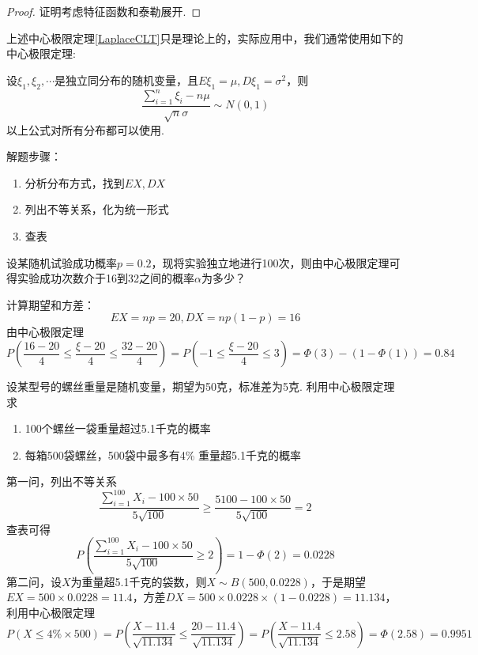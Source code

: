 \begin{proof}
    证明考虑特征函数和泰勒展开.
\end{proof}
上述中心极限定理\ref{LaplaceCLT}只是理论上的，实际应用中，我们通常使用如下的中心极限定理:
\begin{theorem}[中心极限定理]
    设$\xi_1,\xi_2,\cdots$是独立同分布的随机变量，且$E\xi_1=\mu,D\xi_1=\sigma^2$，则
    \[
        \frac{\sum_{i=1}^n \xi_i-n\mu}{\sqrt{n}\sigma}\sim N(0,1)
    \]
    以上公式对所有分布都可以使用.
\end{theorem}
\begin{kaobox}
    解题步骤：
    \begin{enumerate}
        \item 分析分布方式，找到$EX,DX$
        \item 列出不等关系，化为统一形式
        \item 查表
    \end{enumerate}
\end{kaobox}
\begin{example}
    设某随机试验成功概率$p=0.2$，现将实验独立地进行100次，则由中心极限定理可得实验成功次数介于16到32之间的概率$\alpha$为多少？
\end{example}
\begin{solution}
    计算期望和方差：
    \[
        EX=np=20,DX=np(1-p)=16
    \]
    由中心极限定理
    \[
        P(\frac{16-20}{4}\leq \frac{\xi-20}{4}\leq \frac{32-20}{4})=P(-1\leq \frac{\xi-20}{4}\leq 3)=\Phi(3)-(1-\Phi(1))=0.84
    \]
\end{solution}

\begin{example}
    设某型号的螺丝重量是随机变量，期望为50克，标准差为5克. 利用中心极限定理求
    \begin{enumerate}
        \item 100个螺丝一袋重量超过5.1千克的概率
        \item 每箱500袋螺丝，500袋中最多有4\% 重量超5.1千克的概率 
    \end{enumerate}
\end{example}
\begin{solution}
    第一问，列出不等关系
    \[
      \frac{\sum_{i=1}^{100}X_i-100\times 50}{5\sqrt{100}}\ge \frac{5100-100\times 50}{5\sqrt{100}}=2
    \]
    查表可得
    \[
        P(\frac{\sum_{i=1}^{100}X_i-100\times 50}{5\sqrt{100}}\ge 2)=1-\Phi(2)=0.0228
    \]
    第二问，设$X$为重量超5.1千克的袋数，则$X\sim B(500,0.0228)$，于是期望$EX=500\times 0.0228=11.4$，方差$DX=500\times 0.0228\times (1-0.0228)=11.134$，利用中心极限定理
    \[
        P(X\le 4\%\times 500)=P(\frac{X-11.4}{\sqrt{11.134}}\le \frac{20-11.4}{\sqrt{11.134}})=P(\frac{X-11.4}{\sqrt{11.134}}\le 2.58)=\Phi(2.58)=0.9951
    \]
\end{solution}





